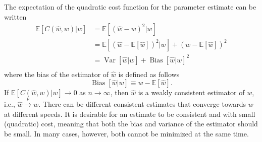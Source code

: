 \begin{theorem}
	\label{theorem:MSE}
	The expectation of the quadratic cost function for the parameter estimate can be written
	\begin{equation}
		\begin{split}
			\mathbb{E}[C(\hat{w}, w)|w] &= \mathbb{E}[(\hat{w}-w)^2|w]\\ 
			&= \mathbb{E}[(\hat{w}-\mathbb{E}[\hat{w}])^2|w]+(w-\mathbb{E}[\hat{w}])^2\\
			&=\operatorname{Var}[\hat{w}|w]+\operatorname{Bias}[\hat{w}|w]^2\\
		\end{split}
		\label{eq:MSE}
	\end{equation}
	where the bias of the estimator of $\hat{w}$ is defined as follows
	\begin{equation}
		\operatorname{Bias}[\hat{w}|w]\equiv w-\mathbb{E}[\hat{w}].
	\end{equation}
	If $\mathbb{E}[C(\hat{w}, w)|w] \to 0$ as $n \to \infty$, then $\hat{w}$ is a weakly consistent estimator of $w$, i.e., $\hat{w} \xrightarrow{p} w$. There can be different consistent estimates that converge towards $w$ at different speeds. It is desirable for an estimate to be consistent and with small (quadratic) cost, meaning that both the bias and variance of the estimator should be small. In many cases, however, both cannot be minimized at the same time. 
\end{theorem}


